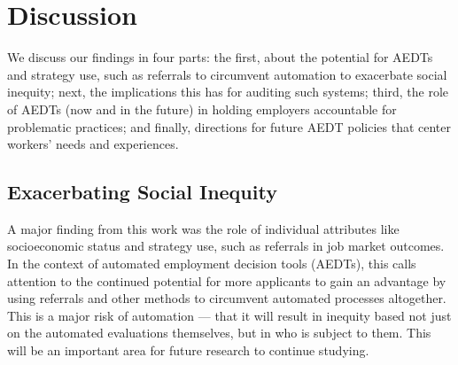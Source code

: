 \section{Discussion}
\label{sec:discussion}

We discuss our findings in four parts: the first, about the potential for AEDTs and strategy use, such as referrals to circumvent automation to exacerbate social inequity; next, the implications this has for auditing such systems; third, the role of AEDTs (now and in the future) in holding employers accountable for problematic practices; and finally, directions for future AEDT policies that center workers' needs and experiences. 

\subsection{Exacerbating Social Inequity}
A major finding from this work was the role of individual attributes like socioeconomic status and strategy use, such as referrals in  job market outcomes. In the context of automated employment decision tools (AEDTs), this calls attention to the continued potential for more applicants to gain an advantage by using referrals and other methods to circumvent automated processes altogether. This is a major risk of automation --- that it will result in inequity based not just on the automated evaluations themselves, but in who is subject to them. This will be an important area for future research to continue studying. 

